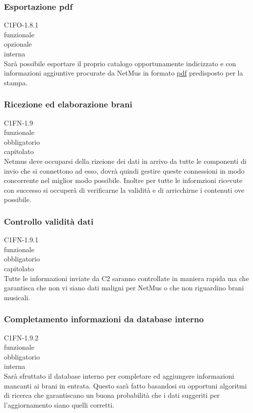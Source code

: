 \subsubsection*{Esportazione pdf}
 C1FO-1.8.1 \\
 funzionale \\
 opzionale \\
 interna \\
Sar\`a possibile esportare il proprio catalogo opportunamente indicizzato e con
informazioni aggiuntive procurate da NetMus in formato \underline{pdf}
predisposto per la stampa.

\subsubsection*{Ricezione ed elaborazione brani}
 C1FN-1.9 \\
 funzionale \\
 obbligatorio \\
 capitolato \\
Netmus deve occuparsi della rizeione dei dati in arrivo da tutte le componenti
di invio che si connettono ad esso, dovr\`a quindi gestire queste connessioni in
modo concorrente nel miglior modo possibile. Inoltre per tutte le informzioni
ricevute con successo si occuper\`a di verificarne la validit\`a e di arricchirne i
contenuti ove possibile.

\subsubsection*{Controllo validit\`a dati}
 C1FN-1.9.1 \\
 funzionale \\
 obbligatorio \\
 capitolato \\
Tutte le informazioni inviate da C2 saranno controllate in maniera
rapida ma che garantisca che non vi siano dati maligni per NetMus o che non
riguardino brani musicali.

\subsubsection*{Completamento informazioni da database interno}
 C1FN-1.9.2 \\
 funzionale \\
 obbligatorio \\
 interna \\
Sar\`a sfruttato il database interno per completare ed aggiungere informazioni
mancanti ai brani in entrata. Questo sar\`a fatto basandosi su opportuni algoritmi
di ricerca che garantiscano un buona probabilit\`a che i dati suggeriti per
l'aggiornamento siano quelli corretti.

